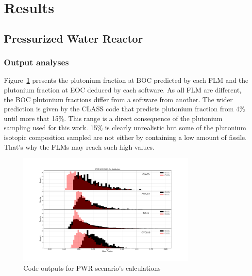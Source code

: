 
\section{Results}


\subsection{Pressurized Water Reactor}

\subsubsection{Output analyses}
Figure~\ref{fig:PWR_MOX_FLM_Pu} presents the plutonium fraction at BOC predicted by each FLM and the plutonium fraction at EOC deduced by each software. As all FLM are different, the BOC plutonium fractions differ from a software from another. The wider prediction is given by the CLASS code that predicts plutonium fraction from 4\% until more that 15\%. This range is a direct consequence of the plutonium sampling used for this work. 15\% is clearly unrealistic but some of the plutonium isotopic composition sampled are not either by containing a low amount of fissile. That's why the FLMs may reach such high values.    

\begin{figure}[h]
	\begin{center}
		\includegraphics[width = 0.8\textwidth]{../../Feature_1/RAW_DATA/FIG/PWR_MOX_FLM_Pu.pdf}
		\caption{Code outputs for PWR scenario's calculations}
		\label{fig:PWR_MOX_FLM_Pu}
	\end{center}
\end{figure}

